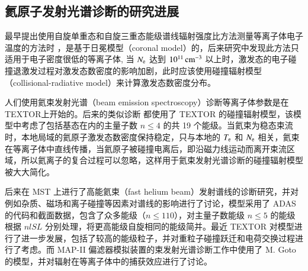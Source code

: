 \subsection{氦原子发射光谱诊断的研究进展}
\label{sec:chap01:research-history}

最早提出使用自旋单重态和自旋三重态能级谱线辐射强度比方法测量等离子体电子温度的方法时
\cite{Sovie1964-He-coronal,Vries1966-He-coronal}，是基于日冕模型（coronal model）的，后来研究中发现此方法只适用于电子密度很低的等离子体, 当 $N_{\rm e}$ 达到 $10^{11}\,{\rm cm}^{-3}$ 以上时，激发态的电子碰撞退激发过程对激发态数密度的影响加剧，此时应该使用碰撞辐射模型（collisional-radiative model）来计算激发态数密度分布\cite{Newe1966-He-CRRecommend}。

人们使用氦束发射光谱（beam emission spectroscopy）诊断等离子体参数是在 TEXTOR\cite{Schweer1992174}上开始的。后来的类似诊断\cite{Davies1997-HeBES-JET,Field-HeBES-COMPASSD,Hidalgo-HeBES-TJII}
都使用了 TEXTOR 的碰撞辐射模型，该模型中考虑了包括基态在内的主量子数 $n\le 4$ 的共 19 个能级。当氦束为稳态束流时，本地局域的氦原子激发态数密度保持稳定，只与本地的 $T_{\rm e}$ 和 $N_{\rm e}$ 相关，氦束在等离子体中直线传播，当氦原子被碰撞电离后，即沿磁力线运动而离开束流区域，所以氦离子的复合过程可以忽略，这样用于氦束发射光谱诊断的碰撞辐射模型被大大简化。

后来在 MST 上进行了高能氦束（fast helium beam）发射谱线的诊断研究\cite{Ahn2007-He-BES}，并对例如杂质、磁场和离子碰撞等因素对谱线的影响进行了讨论，模型采用了 ADAS\cite{ADAS} 的代码和截面数据，包含了众多能级（$n\le 110$），对主量子数能级 $n\le5$ 的能级根据 $nlSL$ 分别处理，将更高能级自旋相同的能级简并。最近 TEXTOR 对模型进行了进一步发展\cite{Schmitz2008}，包括了较高的能级粒子，并对重粒子碰撞跃迁和电荷交换过程进行了考虑。而 MAP-II 偏滤器模拟装置\cite{Iida2010-HeBES-MAPII}的束发射光谱诊断工作中使用了 M. Goto 的模型\cite{Goto2003-HeCRM}，并对辐射在等离子体中的捕获效应进行了讨论。

